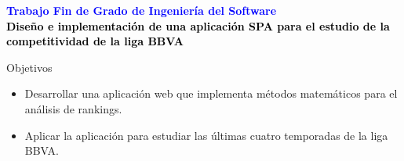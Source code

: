 \documentclass[10pt,hyperref={unicode}]{beamer}
\begin{document}
%	
	
	\begin{frame}
			\begin{center}
				\Huge\textbf{\textsf{\textcolor{blue}{Trabajo Fin de Grado de Ingeniería del Software}}} \\ 
				\vspace*{1em}
				\huge\textbf{\textsf{\textcolor{black}{Diseño e implementación de una aplicación SPA para el estudio de la competitividad de la liga BBVA}}}
			\end{center}
		\end{frame}
			
		\begin{frame}{Objetivos}
			\begin{itemize}
				\item Desarrollar una aplicación web que implementa métodos matemáticos para el análisis de rankings.
				\item Aplicar la aplicación para estudiar las últimas cuatro temporadas de la liga BBVA.
			\end{itemize}
		\end{frame}
	
\end{document}
